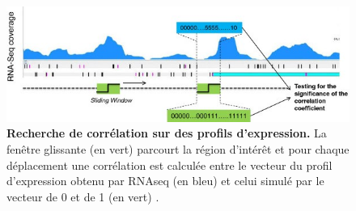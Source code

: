 \documentclass[12pt,a4paper]{report}
\begin{document}
\begin{onehalfspace}
\begin{figure}[ht]
\centerline{\includegraphics[scale=0.6]{figures/profil.jpg}}
\caption{\textbf{Recherche de corrélation sur des profils d'expression.} La fenêtre glissante (en vert) parcourt la région d'intérêt et pour chaque déplacement une corrélation est calculée entre le vecteur du profil d'expression obtenu par RNAseq (en bleu) et celui simulé par le vecteur de 0 et de 1 (en vert) \citep{Fortino2014}.}
\label{fig:profil} 
\end{figure}


\end{onehalfspace}
\end{document}
